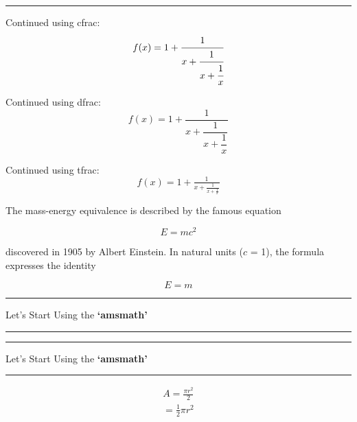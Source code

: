 \documentclass[12pt, letterpaper]{article}
\begin{document}
\noindent\rule{\linewidth}{5pt}



Continued using cfrac:
\[
f(x) = 1 + \cfrac{1}{x + \cfrac{1}{x + \cfrac{1}{x}}}
\]


Continued using dfrac:
\[
f(x) = 1 + \dfrac{1}{x + \dfrac{1}{x + \dfrac{1}{x}}}
\]


Continued using tfrac:
\[
f(x) = 1 + \tfrac{1}{x + \tfrac{1}{x + \tfrac{1}{x}}}
\]















\newpage


The mass-energy equivalence is described by the famous equation

\[E=mc^2\]

discovered in 1905 by Albert Einstein. 
In natural units ($c$ = 1), the formula expresses the identity

\begin{equation}
E=m
\end{equation}


\newcommand{\titlevariable}{Let's Start Using the \textbf{`amsmath'}}

\noindent\rule{\linewidth}{5pt}
\begin{center}
\titlevariable \par
\end{center}
\noindent\rule{\linewidth}{5pt}


\begin{center}
\noindent\rule{\linewidth}{5pt}
\titlevariable \par
\noindent\rule{\linewidth}{5pt}
\end{center}




\begin{equation*}
\begin{split}
A = \frac{\pi r^2}{2} \\
  = \frac{1}{2} \pi r^2
\end{split}
\end{equation*}
\end{document}
